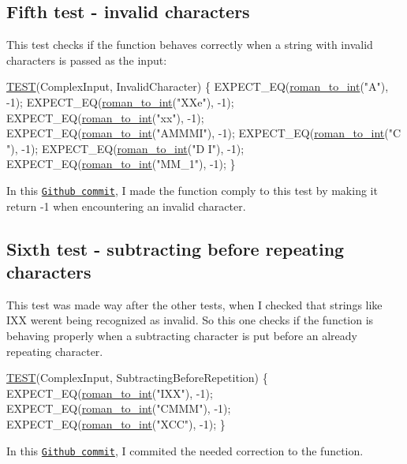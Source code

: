 \subsection*{Fifth test -\/ invalid characters }

This test checks if the function behaves correctly when a string with invalid characters is passed as the input\+:


\begin{DoxyCodeInclude}
\hyperlink{test_simple_8c_aff9fa977573ddab7597e233f1775d7c5}{TEST}(ComplexInput, InvalidCharacter) \{
    EXPECT\_EQ(\hyperlink{roman_8c_a5d15ad3ed29e4dc0fed9b718523c48c8}{roman\_to\_int}(\textcolor{stringliteral}{"A"}), -1);
    EXPECT\_EQ(\hyperlink{roman_8c_a5d15ad3ed29e4dc0fed9b718523c48c8}{roman\_to\_int}(\textcolor{stringliteral}{"XXe"}), -1);
    EXPECT\_EQ(\hyperlink{roman_8c_a5d15ad3ed29e4dc0fed9b718523c48c8}{roman\_to\_int}(\textcolor{stringliteral}{"xx"}), -1);
    EXPECT\_EQ(\hyperlink{roman_8c_a5d15ad3ed29e4dc0fed9b718523c48c8}{roman\_to\_int}(\textcolor{stringliteral}{"AMMMI"}), -1);
    EXPECT\_EQ(\hyperlink{roman_8c_a5d15ad3ed29e4dc0fed9b718523c48c8}{roman\_to\_int}(\textcolor{stringliteral}{"C "}), -1);
    EXPECT\_EQ(\hyperlink{roman_8c_a5d15ad3ed29e4dc0fed9b718523c48c8}{roman\_to\_int}(\textcolor{stringliteral}{"D  I"}), -1);
    EXPECT\_EQ(\hyperlink{roman_8c_a5d15ad3ed29e4dc0fed9b718523c48c8}{roman\_to\_int}(\textcolor{stringliteral}{"MM\_1"}), -1);
\}
\end{DoxyCodeInclude}
 In this \href{https://github.com/diogenes1oliveira/libroman/commit/818abdde2a85e1c1924458c4f25cfff65835bc95#diff-3d6fc1bf772186c45fcd2c22d7ecd7b4}{\tt Github commit}, I made the function comply to this test by making it return {\ttfamily -\/1} when encountering an invalid character.

\subsection*{Sixth test -\/ subtracting before repeating characters }

This test was made way after the other tests, when I checked that strings like I\+XX weren\textquotesingle{}t being recognized as invalid. So this one checks if the function is behaving properly when a subtracting character is put before an already repeating character.


\begin{DoxyCodeInclude}
\hyperlink{test_simple_8c_aff9fa977573ddab7597e233f1775d7c5}{TEST}(ComplexInput, SubtractingBeforeRepetition) \{
    EXPECT\_EQ(\hyperlink{roman_8c_a5d15ad3ed29e4dc0fed9b718523c48c8}{roman\_to\_int}(\textcolor{stringliteral}{"IXX"}), -1);
    EXPECT\_EQ(\hyperlink{roman_8c_a5d15ad3ed29e4dc0fed9b718523c48c8}{roman\_to\_int}(\textcolor{stringliteral}{"CMMM"}), -1);
    EXPECT\_EQ(\hyperlink{roman_8c_a5d15ad3ed29e4dc0fed9b718523c48c8}{roman\_to\_int}(\textcolor{stringliteral}{"XCC"}), -1);
\}
\end{DoxyCodeInclude}
 In this \href{https://github.com/diogenes1oliveira/libroman/commit/2cd1eaf9f7230c4bff2776c36d46a7cce91239d0#diff-3d6fc1bf772186c45fcd2c22d7ecd7b4}{\tt Github commit}, I commited the needed correction to the function. 